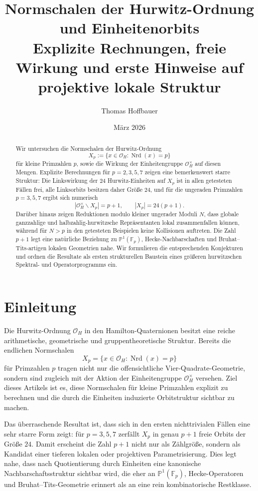 \documentclass[12pt,a4paper]{article}
\title{\textbf{Normschalen der Hurwitz-Ordnung und Einheitenorbits}\\
	\large Explizite Rechnungen, freie Wirkung und erste Hinweise auf projektive lokale Struktur}
\author{Thomas Hoffbauer}
\date{März 2026}
\theoremstyle{plain}
\theoremstyle{definition}
\theoremstyle{remark}
\newcommand{\OH}{\mathcal O_H}
\newcommand{\Fp}{\mathbb F_p}
\newcommand{\PP}{\mathbb P}
\newcommand{\nrd}{\operatorname{Nrd}}
\begin{document}
	
	\maketitle
	
	\begin{abstract}
		Wir untersuchen die Normschalen der Hurwitz-Ordnung
		\[
		X_p := \{x\in \OH : \nrd(x)=p\}
		\]
		für kleine Primzahlen \(p\), sowie die Wirkung der Einheitengruppe \(\OH^\times\) auf diesen Mengen.
		Explizite Berechnungen für \(p=2,3,5,7\) zeigen eine bemerkenswert starre Struktur:
		Die Linkswirkung der \(24\) Hurwitz-Einheiten auf \(X_p\) ist in allen getesteten Fällen frei,
		alle Linksorbits besitzen daher Größe \(24\), und für die ungeraden Primzahlen \(p=3,5,7\)
		ergibt sich numerisch
		\[
		|\OH^\times\backslash X_p|=p+1,
		\qquad
		|X_p|=24(p+1).
		\]
		Darüber hinaus zeigen Reduktionen modulo kleiner ungerader Moduli \(N\), dass globale ganzzahlige
		und halbzahlig-hurwitzsche Repräsentanten lokal zusammenfallen können, während für \(N>p\) in den
		getesteten Beispielen keine Kollisionen auftreten. Die Zahl \(p+1\) legt eine natürliche Beziehung
		zu \(\PP^1(\Fp)\), Hecke-Nachbarschaften und Bruhat--Tits-artigen lokalen Geometrien nahe.
		Wir formulieren die entsprechenden Konjekturen und ordnen die Resultate als ersten strukturellen
		Baustein eines größeren hurwitzschen Spektral- und Operatorprogramms ein.
	\end{abstract}
	
	\section{Einleitung}
	
	Die Hurwitz-Ordnung \(\OH\) in den Hamilton-Quaternionen besitzt eine reiche arithmetische,
	geometrische und gruppentheoretische Struktur. Bereits die endlichen Normschalen
	\[
	X_p=\{x\in \OH:\nrd(x)=p\}
	\]
	für Primzahlen \(p\) tragen nicht nur die offensichtliche Vier-Quadrate-Geometrie, sondern sind
	zugleich mit der Aktion der Einheitengruppe \(\OH^\times\) versehen. Ziel dieses Artikels ist es,
	diese Normschalen für kleine Primzahlen explizit zu berechnen und die durch die Einheiten induzierte
	Orbitstruktur sichtbar zu machen.
	
	Das überraschende Resultat ist, dass sich in den ersten nichttrivialen Fällen eine sehr starre Form zeigt:
	für \(p=3,5,7\) zerfällt \(X_p\) in genau \(p+1\) freie Orbits der Größe \(24\). Damit erscheint die Zahl
	\(p+1\) nicht nur als Zählgröße, sondern als Kandidat einer tieferen lokalen oder projektiven Parametrisierung.
	Dies legt nahe, dass nach Quotientierung durch Einheiten eine kanonische Nachbarschaftsstruktur sichtbar wird,
	die eher an \(\PP^1(\Fp)\), Hecke-Operatoren und Bruhat--Tits-Geometrie erinnert als an eine rein kombinatorische
	Restklasse.
	
\end{document}
